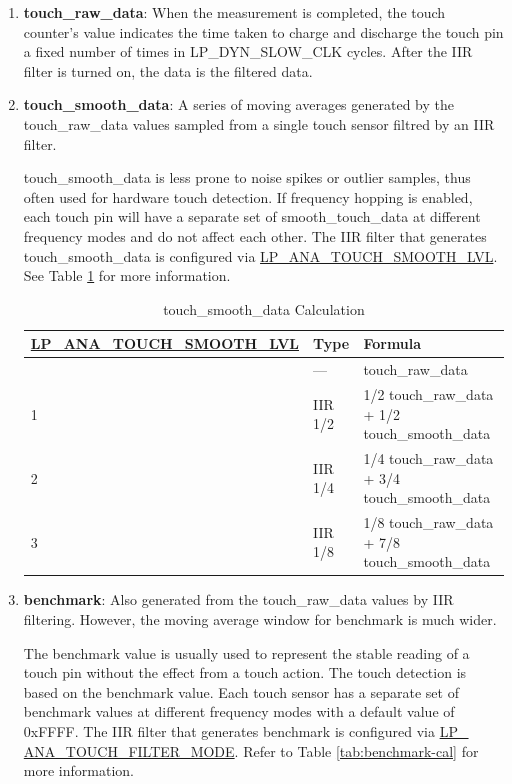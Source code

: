 \documentclass[main\_\_EN.tex]{subfiles}
\begin{document}
\begin{enumerate}
    \item \textbf{touch\_raw\_data}: When the measurement is completed, the touch counter's value indicates the time taken to charge and discharge the touch pin a fixed number of times in LP\_DYN\_SLOW\_CLK cycles. After the IIR filter is turned on, the data is the filtered data.

    \item \textbf{touch\_smooth\_data}: A series of moving averages generated by the touch\_raw\_data values sampled from a single touch sensor filtred by an IIR filter.

    touch\_smooth\_data is less prone to noise spikes or outlier samples, thus often used for hardware touch detection. If frequency hopping is enabled, each touch pin will have a separate set of smooth\_touch\_data at different frequency modes and do not affect each other. The IIR filter that generates touch\_smooth\_data is configured via \hyperref[fielddesc:LPANATOUCHSMOOTHLVL]{LP\_ANA\_TOUCH\_SMOOTH\_LVL}. See Table \ref{tab:smooth-cal} for more information.

    \begin{longtable}[c]{|p{5.5 cm}|p{1.5cm}|p{8.5cm}|}
        \caption{touch\_smooth\_data Calculation}
        \label{tab:smooth-cal}\\
        \hline
        \rowcolor{lightgray}
        \textbf{\hyperref[fielddesc:LPANATOUCHSMOOTHLVL]{LP\_ANA\_TOUCH\_SMOOTH\_LVL}} & \textbf{Type} & \textbf{Formula}\\ 
        \hline
        \endhead
        \endfoot
        \endlastfoot
        0  & --- & touch\_raw\_data  \\\hline
        1  & IIR 1/2 & 1/2 touch\_raw\_data + 1/2 touch\_smooth\_data \\\hline
        2  & IIR 1/4 & 1/4 touch\_raw\_data + 3/4 touch\_smooth\_data \\\hline
        3  & IIR 1/8 & 1/8 touch\_raw\_data + 7/8 touch\_smooth\_data \\\hline
    \end{longtable}

    \item \textbf{benchmark}: Also generated from the touch\_raw\_data values by IIR filtering. However, the moving average window for benchmark is much wider.
    
    The benchmark value is usually used to represent the stable reading of a touch pin without the effect from a touch action. The touch detection is based on the benchmark value. Each touch sensor has a separate set of benchmark values at different frequency modes with a default value of 0xFFFF. The IIR filter that generates benchmark is configured via \hyperref[fielddesc:LPANATOUCHFILTERMODE]{LP\_ ANA\_TOUCH\_FILTER\_MODE}. Refer to Table \ref{tab:benchmark-cal} for more information.


\end{enumerate}
\end{document}
